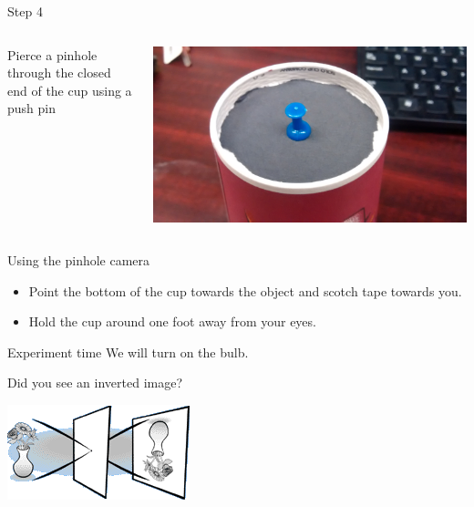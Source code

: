 \begin{frame}{Step 4}
  \begin{columns}
    \begin{column}{0.6\textwidth}
      Pierce a pinhole through the closed end of the cup using a push pin
    \end{column}
    \begin{column}{0.4\textwidth}
      \includegraphics[width=\textwidth]{media/pushpin.jpg}
    \end{column}
  \end{columns}
\end{frame}

\begin{frame}{Using the pinhole camera}
  \begin{itemize}
    \item
      Point the bottom of the cup towards the object and scotch tape towards you.\\
    \item
      Hold the cup around one foot away from your eyes.
  \end{itemize}
\end{frame}

\begin{frame}{Experiment time}
  We will turn on the bulb.
\end{frame}

\begin{frame}{Did you see an inverted image?}
  \begin{center}
    \includegraphics{media/upside_down_vase.png}
  \end{center}
\end{frame}

